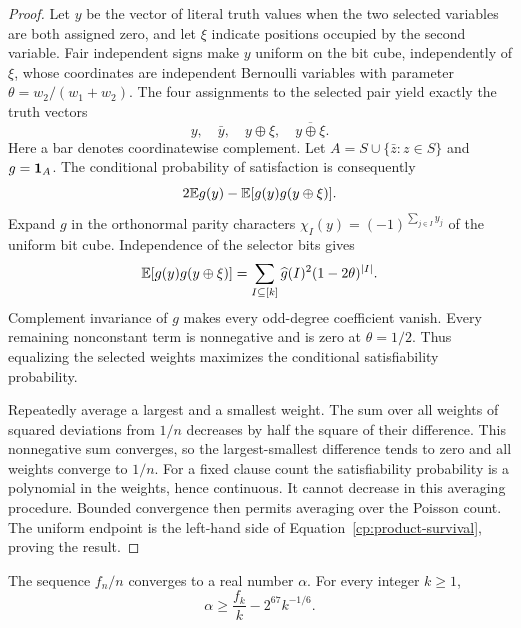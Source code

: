 \begin{proof}
Let $y$ be the vector of literal truth values when the two selected
variables are both assigned zero, and let $\xi$ indicate positions occupied
by the second variable. Fair independent signs make $y$ uniform on the
bit cube, independently of $\xi$, whose coordinates are independent Bernoulli
variables with parameter $\theta=w_2/(w_1+w_2)$. The four assignments to
the selected pair yield exactly the truth vectors
\[
 y,\quad\bar y,\quad y\oplus\xi,\quad\overline{y\oplus\xi}.
\]
Here a bar denotes coordinatewise complement. Let
$A=S\cup\{\bar z:z\in S\}$ and $g=\mathbf 1_A$. The conditional probability
of satisfaction is consequently
\[
 2\mathbb E g(y)-\mathbb E[g(y)g(y\oplus\xi)].
\]
Expand $g$ in the orthonormal parity characters
$\chi_I(y)=(-1)^{\sum_{j\in I}y_j}$ of the uniform bit cube. Independence
of the selector bits gives
\[
 \mathbb E[g(y)g(y\oplus\xi)]
 =\sum_{I\subseteq[k]}\widehat g(I)^2(1-2\theta)^{|I|}.
\]
Complement invariance of $g$ makes every odd-degree coefficient vanish.
Every remaining nonconstant term is nonnegative and is zero at
$\theta=1/2$. Thus equalizing the selected weights maximizes the
conditional satisfiability probability.

Repeatedly average a largest and a smallest weight. The sum over all
weights of squared deviations from $1/n$ decreases by half the square of their
difference. This nonnegative sum converges, so the largest-smallest
difference tends to zero and all weights converge to $1/n$. For a fixed
clause count the satisfiability probability is a polynomial in the
weights, hence continuous. It cannot decrease in this averaging procedure.
Bounded convergence then permits averaging over the Poisson count. The
uniform endpoint is the left-hand side of
Equation~\eqref{cp:product-survival}, proving the result.
\end{proof}

\begin{proposition}
\label{cp:lower}
The sequence $f_n/n$ converges to a real number $\alpha$. For every integer $k\ge1$,
\begin{equation}\label{cp:certified-lower}
 \alpha\ge\frac{f_k}{k}-2^{67}k^{-1/6}.
\end{equation}
\end{proposition}

